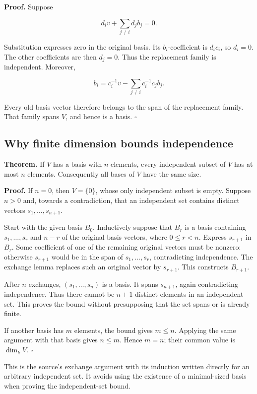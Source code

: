 \documentclass[
  english,
]{article}
\begin{document}
\textbf{Proof.} Suppose

\[
d_i v+\sum_{j\ne i}d_jb_j=0.
\]

Substitution expresses zero in the original basis. Its
\(b_i\)-coefficient is \(d_ic_i\), so \(d_i=0\). The other coefficients
are then \(d_j=0\). Thus the replacement family is independent.
Moreover,

\[
b_i=c_i^{-1}v-\sum_{j\ne i}c_i^{-1}c_jb_j.
\]

Every old basis vector therefore belongs to the span of the replacement
family. That family spans \(V\), and hence is a basis. \(\square\)

\subsection{Why finite dimension bounds
independence}\label{why-finite-dimension-bounds-independence}

\textbf{Theorem.} If \(V\) has a basis with \(n\) elements, every
independent subset of \(V\) has at most \(n\) elements. Consequently all
bases of \(V\) have the same size.

\textbf{Proof.} If \(n=0\), then \(V=\{0\}\), whose only independent
subset is empty. Suppose \(n>0\) and, towards a contradiction, that an
independent set contains distinct vectors \(s_1,\ldots,s_{n+1}\).

Start with the given basis \(B_0\). Inductively suppose that \(B_r\) is
a basis containing \(s_1,\ldots,s_r\) and \(n-r\) of the original basis
vectors, where \(0\le r<n\). Express \(s_{r+1}\) in \(B_r\). Some
coefficient of one of the remaining original vectors must be nonzero:
otherwise \(s_{r+1}\) would be in the span of \(s_1,\ldots,s_r\),
contradicting independence. The exchange lemma replaces such an original
vector by \(s_{r+1}\). This constructs \(B_{r+1}\).

After \(n\) exchanges, \((s_1,\ldots,s_n)\) is a basis. It spans
\(s_{n+1}\), again contradicting independence. Thus there cannot be
\(n+1\) distinct elements in an independent set. This proves the bound
without presupposing that the set spans or is already finite.

If another basis has \(m\) elements, the bound gives \(m\le n\).
Applying the same argument with that basis gives \(n\le m\). Hence
\(m=n\); their common value is \(\dim_k V\). \(\square\)

This is the source's exchange argument with its induction written
directly for an arbitrary independent set. It avoids using the existence
of a minimal-sized basis when proving the independent-set bound.
\end{document}
